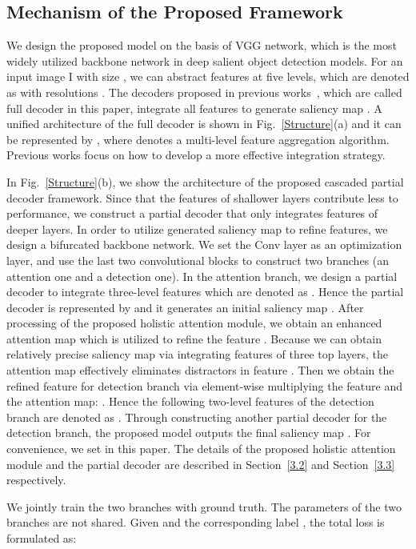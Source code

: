 \documentclass[10pt,twocolumn,letterpaper]{article}
\begin{document}
\subsection{Mechanism of the Proposed Framework}\label{3.1}
We design the proposed model on the basis of VGG network, which is the most widely utilized backbone network in deep salient object detection models. For an input image I with size , we can abstract features at five levels, which are denoted as  with resolutions . The decoders proposed in previous works~\cite{2018BMPM,2017Amulet}, which are called full decoder in this paper, integrate all features to generate saliency map . A unified architecture of the full decoder is shown in Fig.~\ref{Structure}(a) and it can be represented by , where  denotes a multi-level feature aggregation algorithm. Previous works focus on how to develop a more effective integration strategy.

In Fig.~\ref{Structure}(b), we show the architecture of the proposed cascaded partial decoder framework. Since that the features of shallower layers contribute less to performance, we construct a partial decoder that only integrates features of deeper layers. In order to utilize generated saliency map to refine features, we design a bifurcated backbone network. We set the Conv layer as an optimization layer, and use the last two convolutional blocks to construct two branches (an attention one and a detection one). In the attention branch, we design a partial decoder to integrate three-level features which are denoted as . Hence the partial decoder is represented by  and it generates an initial saliency map . After processing of the proposed holistic attention module, we obtain an enhanced attention map  which is utilized to refine the feature . Because we can obtain relatively precise saliency map via integrating features of three top layers, the attention map  effectively eliminates distractors in feature . Then we obtain the refined feature  for detection branch via element-wise multiplying the feature and the attention map: . Hence the following two-level features of the detection branch are denoted as . Through constructing another partial decoder  for the detection branch, the proposed model outputs the final saliency map . For convenience, we set  in this paper. The details of the proposed holistic attention module and the partial decoder are described in Section~\ref{3.2} and Section~\ref{3.3} respectively.

We jointly train the two branches with ground truth. The parameters of the two branches are not shared. Given  and the corresponding label , the total loss  is formulated as:
\end{document}
